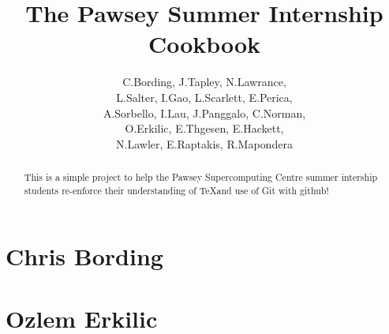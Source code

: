 \documentclass[11pt,a4paper]{report}
\title{The Pawsey Summer Internship Cookbook}
\author{C.Bording, J.Tapley, N.Lawrance,\\
L.Salter, I.Gao, L.Scarlett, E.Perica,\\
A.Sorbello, I.Lau, J.Panggalo, C.Norman,\\
O.Erkilic, E.Thgesen, E.Hackett,\\
N.Lawler, E.Raptakis, R.Mapondera}
\begin{document}
\maketitle
\tableofcontents


\begin{abstract}

This is a simple project to help the Pawsey Supercomputing Centre summer intership students re-enforce their understanding of \TeX and use of Git with github!

\end{abstract}

\chapter{Chris Bording}


\chapter{Ozlem Erkilic}

\end{document}
